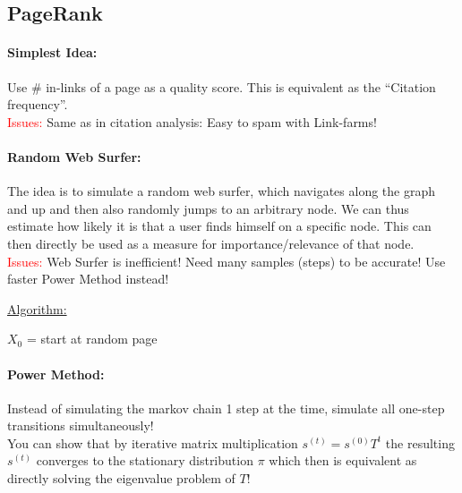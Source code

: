 \documentclass[a4paper,11pt]{article}
\begin{document}
\begin{multicols}{2}
\subsection{PageRank}
\paragraph{Simplest Idea:} Use \# in-links of a page as a quality score. This is equivalent as the ``Citation frequency''.\\
\textcolor{red}{Issues:} Same as in citation analysis: Easy to spam with Link-farms!

\paragraph{Random Web Surfer:} The idea is to simulate a random web surfer, which navigates along the graph and up and then also randomly jumps to an arbitrary node. We can thus estimate how likely it is that a user finds himself on a specific node. This can then directly be used as a measure for importance/relevance of that node.\\
\textcolor{red}{Issues:} Web Surfer is inefficient! Need many samples (steps) to be accurate! Use faster Power Method instead!

\begin{addmargin}[0.28cm]{0cm} %
  \underline{Algorithm:}\\
  \begin{algorithm}[H]
   $X_0$ = start at random page\\
  \end{algorithm}  
\end{addmargin}

\paragraph{Power Method:} Instead of simulating the markov chain 1 step at the time, simulate all one-step transitions simultaneously! \\
You can show that by iterative matrix multiplication $s^{(t)} = s^{(0)}T^t$ the resulting $s^{(t)}$ converges to the stationary distribution $\pi$ which then is equivalent as directly solving the eigenvalue problem of $T$!


\end{multicols}
\end{document}
